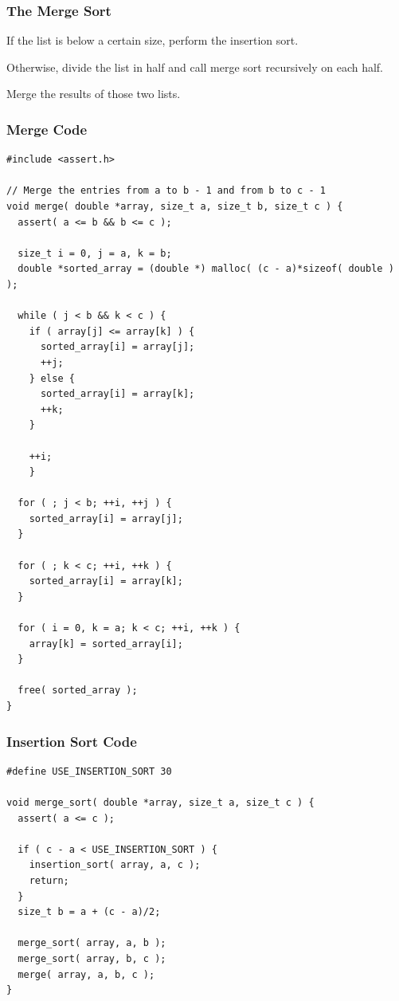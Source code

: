 \begin{frame}
\frametitle{The Merge Sort}


If the list is below a certain size, perform the insertion sort. 

Otherwise, divide the list in half and call merge sort recursively on each half.

Merge the results of those two lists.

\end{frame}
 
\begin{frame}[fragile]
\frametitle{Merge Code}

{\tiny
\begin{verbatim}
#include <assert.h>

// Merge the entries from a to b - 1 and from b to c - 1 
void merge( double *array, size_t a, size_t b, size_t c ) {
  assert( a <= b && b <= c );
  
  size_t i = 0, j = a, k = b;
  double *sorted_array = (double *) malloc( (c - a)*sizeof( double ) );
  
  while ( j < b && k < c ) {
    if ( array[j] <= array[k] ) {
      sorted_array[i] = array[j];
      ++j; 
    } else {
      sorted_array[i] = array[k];
      ++k; 
    }
    
    ++i; 
    }
    
  for ( ; j < b; ++i, ++j ) {
    sorted_array[i] = array[j];
  }
    
  for ( ; k < c; ++i, ++k ) {
    sorted_array[i] = array[k];
  }
    
  for ( i = 0, k = a; k < c; ++i, ++k ) {
    array[k] = sorted_array[i];
  }
    
  free( sorted_array );
}
\end{verbatim}
}


\end{frame}
 
\begin{frame}[fragile]
\frametitle{Insertion Sort Code}


\begin{verbatim}
#define USE_INSERTION_SORT 30

void merge_sort( double *array, size_t a, size_t c ) {
  assert( a <= c );
  
  if ( c - a < USE_INSERTION_SORT ) {
    insertion_sort( array, a, c );
    return;
  }
  size_t b = a + (c - a)/2;
  
  merge_sort( array, a, b );
  merge_sort( array, b, c );
  merge( array, a, b, c );
}
\end{verbatim}

\end{frame}

